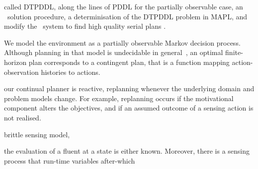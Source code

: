\documentclass[letterpaper]{article}
\begin{document}
 called DTPDDL, along
the lines of PDDL for the partially observable case, an \laostar\
solution procedure, a determinisation of the DTPDDL problem in MAPL,
and modify the \fastdownward\ system to find high quality serial plans
.

We model the environment as a partially observable Markov decision
process. Although planning in that model is undecidable in
general~\cite{}, an optimal finite-horizon plan corresponds to a
contingent plan, that is a function mapping action-observation
histories to actions.

our continual planner is reactive, replanning whenever the underlying
domain and problem models change. For example, replanning occurs if
the motivational component alters the objectives, and if an assumed
outcome of a sensing action is not realised.

brittle sensing model, 

the evaluation of a fluent at a state is either known. Moreover, there
is a sensing process that run-time variables  after-which 




\end{document}
